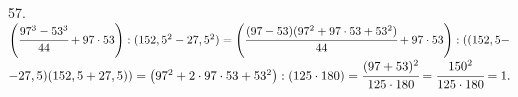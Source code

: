 57. $\left(\cfrac{97^3-53^3}{44}+97\cdot53\right): (152,5^2-27,5^2)=
\left(\cfrac{(97-53)(97^2+97\cdot53+53^2)}{44}+97\cdot53\right):((152,5-$\\$-27,5)(152,5+27,5))=
\left(97^2+2\cdot97\cdot53+53^2\right):(125\cdot180)=\cfrac{(97+53)^2}{125\cdot180}=
\cfrac{150^2}{125\cdot180}=1.$\\
